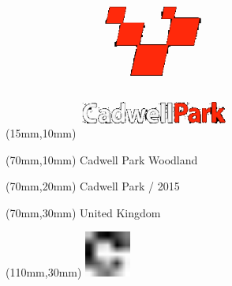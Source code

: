 \null\newpage
\begin{textblock*}{50mm}(15mm,10mm)%
\includegraphics[width=50mm]{LG/CAD.png}
\end{textblock*}
\begin{textblock*}{130mm}(70mm,10mm)%
{\fontsize{20}{20}\selectfont Cadwell Park Woodland}\\
\end{textblock*}
\begin{textblock*}{120mm}(70mm,20mm)%
{\fontsize{16}{16}\selectfont Cadwell Park / 2015}\\
\end{textblock*}
\begin{textblock*}{120mm}(70mm,30mm)%
{\fontsize{12}{12}\selectfont United Kingdom}
\end{textblock*}
\begin{textblock*}{30mm}(110mm,30mm)%
\centering
\includegraphics[height=15mm]{icons/fa-rotate-right.pdf}
\end{textblock*}
